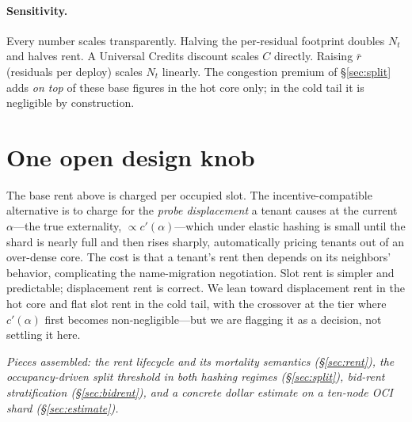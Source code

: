 \documentclass[11pt]{article}
\begin{document}
\paragraph{Sensitivity.} Every number scales transparently. Halving the per-residual footprint doubles $N_t$ and halves rent. A Universal Credits discount scales $C$ directly. Raising $\bar r$ (residuals per deploy) scales $N_t$ linearly. The congestion premium of \S\ref{sec:split} adds \emph{on top} of these base figures in the hot core only; in the cold tail it is negligible by construction.

\section{One open design knob}

The base rent above is charged per occupied slot. The incentive-compatible alternative is to charge for the \emph{probe displacement} a tenant causes at the current $\alpha$---the true externality, $\propto c'(\alpha)$---which under elastic hashing is small until the shard is nearly full and then rises sharply, automatically pricing tenants out of an over-dense core. The cost is that a tenant's rent then depends on its neighbors' behavior, complicating the name-migration negotiation. Slot rent is simpler and predictable; displacement rent is correct. We lean toward displacement rent in the hot core and flat slot rent in the cold tail, with the crossover at the tier where $c'(\alpha)$ first becomes non-negligible---but we are flagging it as a decision, not settling it here.

\bigskip
\noindent\textit{Pieces assembled: the rent lifecycle and its mortality semantics (\S\ref{sec:rent}), the occupancy-driven split threshold in both hashing regimes (\S\ref{sec:split}), bid-rent stratification (\S\ref{sec:bidrent}), and a concrete dollar estimate on a ten-node OCI shard (\S\ref{sec:estimate}).}
\end{document}
